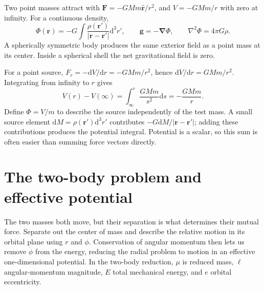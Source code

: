 \documentclass[11pt,oneside]{book}
\newcommand{\dd}{\mathrm{d}}
\newcommand{\vect}[1]{\boldsymbol{#1}}
\newcommand{\grad}{\boldsymbol{\nabla}}
\newcommand{\lap}{\nabla^2}
\theoremstyle{reviewstyle}
\begin{document}
Two point masses attract with $\vect F=-GMm\hat{\vect r}/r^2$, and $V=-GMm/r$ with zero at infinity. For a continuous density,
\begin{equation}
\Phi(\vect r)=-G\int\frac{\rho(\vect r')}{|\vect r-\vect r'|}\dd^3r',
\qquad \vect g=-\grad\Phi,\qquad \lap\Phi=4\pi G\rho.
\end{equation}
A spherically symmetric body produces the same exterior field as a point mass at its center. Inside a spherical shell the net gravitational field is zero.

For a point source, $F_r=-\dd V/\dd r=-GMm/r^2$, hence $\dd V/\dd r=GMm/r^2$. Integrating from infinity to $r$ gives
\begin{equation}
V(r)-V(\infty)=\int_\infty^r\frac{GMm}{s^2}\dd s=-\frac{GMm}{r}.
\end{equation}
Define $\Phi=V/m$ to describe the source independently of the test mass. A small source element $\dd M=\rho(\vect r')\dd^3r'$ contributes $-G\dd M/|\vect r-\vect r'|$; adding these contributions produces the potential integral. Potential is a scalar, so this sum is often easier than summing force vectors directly.

\section{The two-body problem and effective potential}
The two masses both move, but their separation is what determines their mutual force. Separate out the center of mass and describe the relative motion in its orbital plane using $r$ and $\phi$. Conservation of angular momentum then lets us remove $\dot\phi$ from the energy, reducing the radial problem to motion in an effective one-dimensional potential. In the two-body reduction, $\mu$ is reduced mass, $\ell$ angular-momentum magnitude, $E$ total mechanical energy, and $e$ orbital eccentricity.
\end{document}

